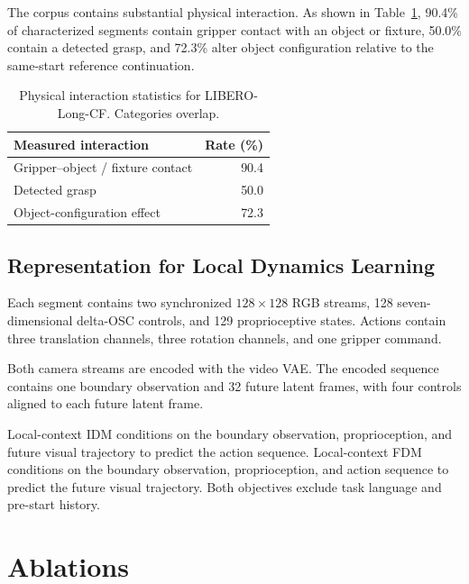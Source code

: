 The corpus contains substantial physical interaction. As shown in
Table~\ref{tab:libero-cf-interaction}, 90.4\% of characterized segments contain
gripper contact with an object or fixture, 50.0\% contain a detected grasp,
and 72.3\% alter object configuration relative to the same-start reference
continuation.

\begin{table}[t]
    \centering
    \caption{
    Physical interaction statistics for LIBERO-Long-CF. Categories overlap.
    }
    \label{tab:libero-cf-interaction}
    \small
    \begin{tabular}{@{}lr@{}}
        \toprule
        \textbf{Measured interaction}
        & \textbf{Rate (\%)} \\
        \midrule
        Gripper--object / fixture contact
        & 90.4 \\
        Detected grasp
        & 50.0 \\
        Object-configuration effect
        & 72.3 \\
        \bottomrule
    \end{tabular}
\end{table}

\subsection{Representation for Local Dynamics Learning}
\label{app:libero-cf-representation}

Each segment contains two synchronized $128\times128$ RGB streams,
128 seven-dimensional delta-OSC controls, and 129 proprioceptive states.
Actions contain three translation channels, three rotation channels, and one
gripper command.

Both camera streams are encoded with the \ours video VAE. The encoded
sequence contains one boundary observation and 32 future latent frames, with
four controls aligned to each future latent frame.

Local-context IDM conditions on the boundary observation, proprioception, and
future visual trajectory to predict the action sequence. Local-context FDM
conditions on the boundary observation, proprioception, and action sequence to
predict the future visual trajectory. Both objectives exclude task language
and pre-start history.

 

\section{Ablations}
